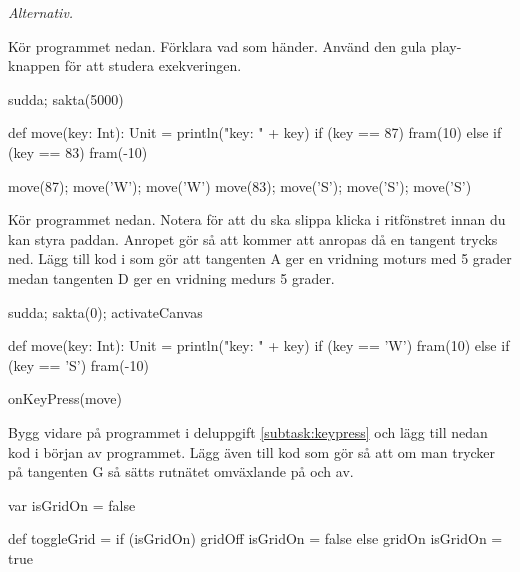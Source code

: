 






\Task \emph{Alternativ.} \label{kojo:alt}

\Subtask Kör programmet nedan. Förklara vad som händer. Använd den gula play-knappen för att studera exekveringen.

\begin{Code}
sudda; sakta(5000)

def move(key: Int): Unit = {
  println("key: " + key)
  if (key == 87) fram(10)
  else if (key == 83) fram(-10)
}

move(87); move('W'); move('W')
move(83); move('S'); move('S'); move('S')
\end{Code}

\Subtask \label{subtask:keypress}  Kör programmet nedan. Notera  för att du ska slippa klicka i ritfönstret innan du kan styra paddan. Anropet  gör så att  kommer att anropas då en tangent trycks ned. Lägg till kod i  som gör att tangenten A ger en vridning moturs med 5 grader medan tangenten D ger en vridning medurs 5 grader.

\begin{Code}
sudda; sakta(0); activateCanvas

def move(key: Int): Unit = {
  println("key: " + key)
  if (key == 'W') fram(10)
  else if (key == 'S') fram(-10)
}

onKeyPress(move)
\end{Code}

\Subtask Bygg vidare på programmet i deluppgift \ref{subtask:keypress} och lägg till nedan kod i början av programmet. Lägg även till kod som gör så att om man trycker på tangenten G så sätts rutnätet omväxlande på och av.

\begin{Code}
var isGridOn = false

def toggleGrid =
  if (isGridOn) {
    gridOff
    isGridOn = false
  } else {
    gridOn
    isGridOn = true
  }
\end{Code}



